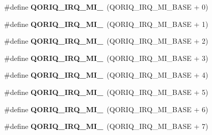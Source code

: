 \begin{DoxyCompactItemize}
\item 
\mbox{\label{group__QoriqInterruptIPI_ga9cefc3f3c5981e53c4e2cb45e43797a1}} 
\#define {\bfseries Q\+O\+R\+I\+Q\+\_\+\+I\+R\+Q\+\_\+\+M\+I\+\_}~(Q\+O\+R\+I\+Q\+\_\+\+I\+R\+Q\+\_\+\+M\+I\+\_\+\+B\+A\+SE + 0)
\item 
\mbox{\label{group__QoriqInterruptIPI_gaee76d2575f199269199a87c09ccb365c}} 
\#define {\bfseries Q\+O\+R\+I\+Q\+\_\+\+I\+R\+Q\+\_\+\+M\+I\+\_}~(Q\+O\+R\+I\+Q\+\_\+\+I\+R\+Q\+\_\+\+M\+I\+\_\+\+B\+A\+SE + 1)
\item 
\mbox{\label{group__QoriqInterruptIPI_ga489c312fe557846ded4efb7abcc19b63}} 
\#define {\bfseries Q\+O\+R\+I\+Q\+\_\+\+I\+R\+Q\+\_\+\+M\+I\+\_}~(Q\+O\+R\+I\+Q\+\_\+\+I\+R\+Q\+\_\+\+M\+I\+\_\+\+B\+A\+SE + 2)
\item 
\mbox{\label{group__QoriqInterruptIPI_ga30d884e9dabc10c5aef54ce0ce40ad64}} 
\#define {\bfseries Q\+O\+R\+I\+Q\+\_\+\+I\+R\+Q\+\_\+\+M\+I\+\_}~(Q\+O\+R\+I\+Q\+\_\+\+I\+R\+Q\+\_\+\+M\+I\+\_\+\+B\+A\+SE + 3)
\item 
\mbox{\label{group__QoriqInterruptIPI_ga53f05328f4f6e6531428349507d27317}} 
\#define {\bfseries Q\+O\+R\+I\+Q\+\_\+\+I\+R\+Q\+\_\+\+M\+I\+\_}~(Q\+O\+R\+I\+Q\+\_\+\+I\+R\+Q\+\_\+\+M\+I\+\_\+\+B\+A\+SE + 4)
\item 
\mbox{\label{group__QoriqInterruptIPI_ga005ea2165a5363934784fe14da0e41b5}} 
\#define {\bfseries Q\+O\+R\+I\+Q\+\_\+\+I\+R\+Q\+\_\+\+M\+I\+\_}~(Q\+O\+R\+I\+Q\+\_\+\+I\+R\+Q\+\_\+\+M\+I\+\_\+\+B\+A\+SE + 5)
\item 
\mbox{\label{group__QoriqInterruptIPI_ga0bec6d37884a4852b513a2a5e5db1491}} 
\#define {\bfseries Q\+O\+R\+I\+Q\+\_\+\+I\+R\+Q\+\_\+\+M\+I\+\_}~(Q\+O\+R\+I\+Q\+\_\+\+I\+R\+Q\+\_\+\+M\+I\+\_\+\+B\+A\+SE + 6)
\item 
\mbox{\label{group__QoriqInterruptIPI_gafc863490ad1342b15211baf5fb6dd6fb}} 
\#define {\bfseries Q\+O\+R\+I\+Q\+\_\+\+I\+R\+Q\+\_\+\+M\+I\+\_}~(Q\+O\+R\+I\+Q\+\_\+\+I\+R\+Q\+\_\+\+M\+I\+\_\+\+B\+A\+SE + 7)

\end{DoxyCompactItemize}
